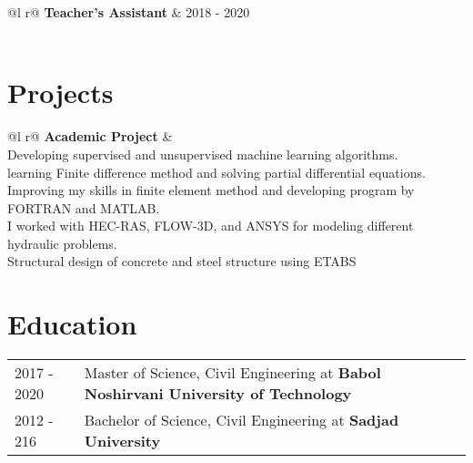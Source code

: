 \documentclass[a4paper,12pt]{article}
\begin{document}
\begin{tabularx}{\linewidth}{ @{}l r@{} }
\textbf{Teacher's Assistant} & \hfill  2018 - 2020 \\[3.75pt]
  \\
\end{tabularx}


\section{Projects}

\begin{tabularx}{\linewidth}{ @{}l r@{} }
\textbf{Academic Project} & \hfill  \\[3.75pt]
{Developing supervised and unsupervised machine learning algorithms.}\\ 
{learning Finite difference method and solving partial differential equations.}\\        
{Improving my skills in finite element method and developing program by FORTRAN and MATLAB.}\\
{I worked with HEC-RAS, FLOW-3D, and ANSYS for modeling different hydraulic problems.}  \\
{Structural design of concrete and steel structure using ETABS}\\
\end{tabularx}

\section{Education}
\begin{tabularx}{\linewidth}{@{}l X@{}}	
2017 - 2020 & Master of Science, Civil Engineering  at \textbf{Babol Noshirvani University of Technology} \hfill \normalsize  \\


2012 - 216 & Bachelor of Science, Civil Engineering at \textbf{Sadjad University} \hfill \\ 

\end{tabularx}

\end{document}
